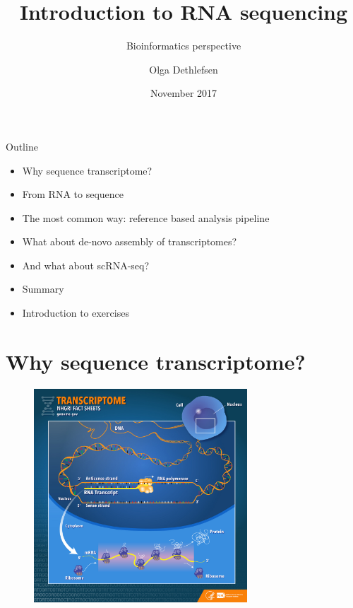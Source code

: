 \documentclass{beamer}\usepackage[]{graphicx}\usepackage[]{color}
\title[RNA-seq]{Introduction to RNA sequencing}
\subtitle{Bioinformatics perspective}
\author[Olga]{Olga Dethlefsen}
\institute[NBIS]{NBIS, National Bioinformatics Infrastructure Sweden\\}
\date[November 2017]{November 2017}
\begin{document}
\begin{frame}
\titlepage
\end{frame}
\logo{}





\begin{frame}
\begin{block}{Outline}
\begin{itemize}
  \item Why sequence transcriptome?
  \item From RNA to sequence
  \item The most common way: reference based analysis pipeline
  \item What about de-novo assembly of transcriptomes?
  \item And what about scRNA-seq?
  \item Summary
  \item Introduction to exercises
 \end{itemize}
\end{block}
\end{frame}

\section{Why sequence transcriptome?}

 
\begin{frame}
\begin{center}
\begin{figure}
\includegraphics[height=8cm]{Images/transcriptome.jpg}
\end{figure}
\end{center}
\end{frame}
\end{document}
